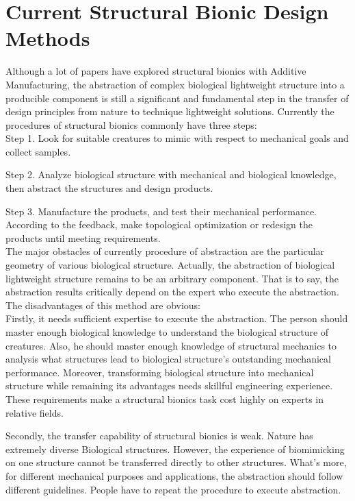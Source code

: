 \section{Current Structural Bionic Design Methods}
Although a lot of papers have explored structural bionics with Additive Manufacturing, the abstraction of complex biological lightweight structure into a producible component is still a significant and fundamental step in the transfer of design principles from nature to technique lightweight solutions. Currently the procedures of structural bionics commonly have three steps:\\

Step 1. Look for suitable creatures to mimic with respect to mechanical goals and collect samples.

Step 2. Analyze biological structure with mechanical and biological knowledge, then abstract the structures and design products.

Step 3. Manufacture the products, and test their mechanical performance. According to the feedback, make topological optimization or redesign the products until meeting requirements.\\

The major obstacles of currently procedure of abstraction are the particular geometry of various biological structure. Actually, the abstraction of biological lightweight structure remains to be an arbitrary component. That is to say, the abstraction results critically depend on the expert who execute the abstraction. The disadvantages of this method are obvious:\\

Firstly, it needs sufficient expertise to execute the abstraction. The person should master enough biological knowledge to understand the biological structure of creatures. Also, he should master enough knowledge of structural mechanics to analysis what structures lead to biological structure’s outstanding mechanical performance. Moreover, transforming biological structure into mechanical structure while remaining its advantages needs skillful engineering experience. These requirements make a structural bionics task cost highly on experts in relative fields.

Secondly, the transfer capability of structural bionics is weak. Nature has extremely diverse Biological structures. However, the experience of biomimicking on one structure cannot be transferred directly to other structures. What’s more, for different mechanical purposes and applications, the abstraction should follow different guidelines. People have to repeat the procedure to execute abstraction.

